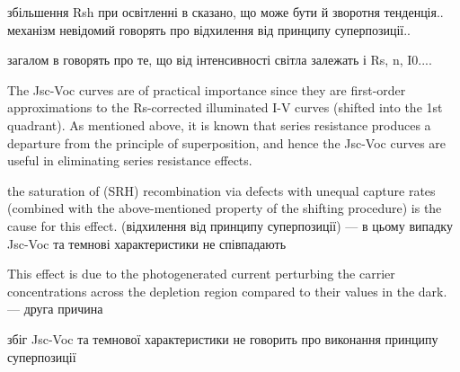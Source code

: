 \documentclass[a4paper,14pt,oneside,openany]{memoir}
\begin{document}
збільшення Rsh при освітленні \cite{Iph:KHAN2010}
в \cite{Breitenstein2013}сказано, що може бути й зворотня тенденція.. механізм невідомий
говорять про відхилення від принципу суперпозиції..

загалом в \cite{Iph:KHAN2010} говорять про те, що від інтенсивності світла залежать і Rs, n, I0....


The Jsc-Voc   curves  are of
practical  importance  since  they  are  first-order  approximations
to  the Rs-corrected  illuminated  I-V  curves  (shifted  into
the  1st  quadrant).
As  mentioned  above,  it  is  known  that
series  resistance  produces  a  departure  from  the  principle  of
superposition,  and  hence  the  Jsc-Voc  curves  are  useful  in
eliminating  series  resistance  effects.

the  saturation  of  (SRH)
recombination  via  defects  with  unequal  capture  rates  (combined with  the above-mentioned  property  of  the shifting  procedure)  is  the  cause  for  this  effect. (відхилення від принципу суперпозиції)  --- в цьому випадку Jsc-Voc та темнові характеристики не співпадають
\cite{Robinson}

This  effect  is  due to  the photogenerated  current  perturbing  the  carrier  concentrations  across  the  depletion  region
compared  to  their  values  in  the  dark.  ---  друга причина

збіг Jsc-Voc та темнової характеристики не говорить про виконання принципу суперпозиції


\end{document}
